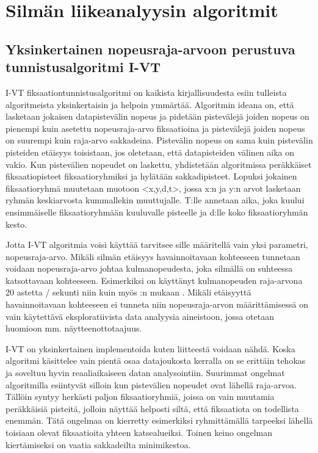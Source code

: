 \section{Silmän liikeanalyysin algoritmit}
\subsection{Yksinkertainen nopeusraja-arvoon perustuva tunnistusalgoritmi I-VT}
I-VT fiksaationtunnistusalgoritmi on kaikista kirjallisuudesta esiin tulleista algoritmeista yksinkertaisin ja helpoin ymmärtää. Algoritmin ideana on, että lasketaan jokaisen datapistevälin nopeus ja pidetään pistevälejä joiden nopeus on pienempi kuin asetettu nopeusraja-arvo fiksaatioina ja pistevälejä joiden nopeus on suurempi kuin raja-arvo sakkadeina. Pistevälin nopeus on sama kuin pistevälin pisteiden etäisyys toisistaan, jos oletetaan, että datapisteiden välinen aika on vakio. Kun pistevälien nopeudet on laskettu, yhdistetään algoritmissa peräkkäiset fiksaatiopisteet fiksaatioryhmiksi ja hylätään sakkadipisteet. Lopuksi jokainen fiksaatioryhmä muutetaan muotoon <x,y,d,t>, jossa x:n ja y:n arvot lasketaan ryhmän keskiarvosta kummallekin muuttujalle. T:lle annetaan aika, joka kuului ensimmäiselle fiksaatioryhmään kuuluvalle pisteelle ja d:lle koko fiksaatioryhmän kesto. \citep[s. 73]{salvucci2000}

 Jotta I-VT algoritmia voisi käyttää tarvitsee sille määritellä vain yksi parametri, nopeusraja-arvo. Mikäli silmän etäisyys havainnoitavaan kohteeseen tunnetaan voidaan nopeusraja-arvo johtaa kulmanopeudesta, joka silmällä on suhteessa katsottavaan kohteeseen. Esimerkiksi \citet[s. 1099]{itti2005} on käyttänyt kulmanopeuden raja-arvona 20 astetta / sekunti niin kuin myös \citet[s. 73]{salvucci2000}:n mukaan \citep[s. 103-111]{megaw1984}.
Mikäli etäisyyttä havainnoitavaan kohteeseen ei tunneta niin nopeusraja-arvon määrittämisessä on vain käytettävä eksploratiivista data analyysia aineistoon, jossa otetaan huomioon mm. näytteenottotaajuus.

I-VT on yksinkertainen implementoida kuten liitteestä \emph{}  voidaan nähdä. Koska algoritmi käsittelee vain pientä osaa datajoukosta kerralla on se erittäin tehokas ja soveltuu hyvin reaaliaikaiseen datan analysointiin. \citep[s. 76]{salvucci2000} Suurimmat ongelmat algoritmilla esiintyvät silloin kun pistevälien nopeudet ovat lähellä raja-arvoa. Tällöin syntyy herkästi paljon fiksaatioryhmiä, joissa on vain muutamia peräkkäisiä pisteitä, jolloin näyttää helposti siltä, että fiksaatiota on todellista enemmän. Tätä ongelmaa on kierretty esimerkiksi ryhmittämällä tarpeeksi lähellä toisiaan olevat fiksaatioita yhteen katsealueiksi. \citep[s. 329]{just1980} Toinen keino ongelman kiertämiseksi on vaatia sakkadeilta minimikestoa. \citep[s. 103-111]{megaw1984}

